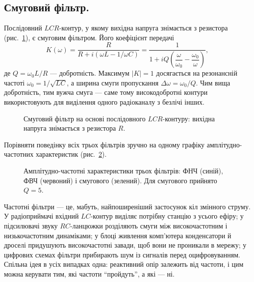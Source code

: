 \subsection*{Смуговий фільтр.}
Послідовний $LCR$-контур, у якому вихідна напруга знімається з резистора (рис.~\ref{tikz:bandpass}), є смуговим фільтром. Його коефіцієнт передачі
\begin{equation}\label{eq:bandpass_transfer}
	K(\omega) = \frac{R}{R + i(\omega L - 1/\omega C)}
	          = \frac{1}{1 + iQ\left(\dfrac{\omega}{\omega_0} - \dfrac{\omega_0}{\omega}\right)},
\end{equation}
де $Q = \omega_0 L/R$ --- добротність. Максимум $|K| = 1$ досягається на резонансній частоті $\omega_0 = 1/\sqrt{LC}$, а ширина смуги пропускання $\Delta\omega = \omega_0/Q$. Чим вища добротність, тим вужча смуга --- саме тому високодобротні контури використовують для виділення одного радіоканалу з безлічі інших.

\begin{figure}[h!]
	\centering
	\caption{Смуговий фільтр на основі послідовного $LCR$-контуру: вихідна напруга знімається з резистора $R$.}
	\label{tikz:bandpass}
\end{figure}

Порівняти поведінку всіх трьох фільтрів зручно на одному графіку амплітудно-частотних характеристик (рис.~\ref{tikz:filter_responses}).

\begin{figure}[h!]
	\centering
	\caption{Амплітудно-частотні характеристики трьох фільтрів: ФНЧ (синій), ФВЧ (червоний) і смугового (зелений). Для смугового прийнято $Q = 5$.}
	\label{tikz:filter_responses}
\end{figure}

\begin{Attention}
	Частотні фільтри --- це, мабуть, найпоширеніший застосунок кіл змінного струму. У радіоприймачі вхідний $LC$-контур виділяє потрібну станцію з усього ефіру; у підсилювачі звуку $RC$-ланцюжки розділяють смуги між високочастотним і низькочастотним динаміками; у блоці живлення комп'ютера конденсатори й дроселі придушують високочастотні завади, щоб вони не проникали в мережу; у цифрових схемах фільтри прибирають шум із сигналів перед оцифровуванням. Спільна ідея в усіх випадках одна: реактивний опір залежить від частоти, і цим можна керувати тим, які частоти \enquote{пройдуть}, а які --- ні.
\end{Attention}

